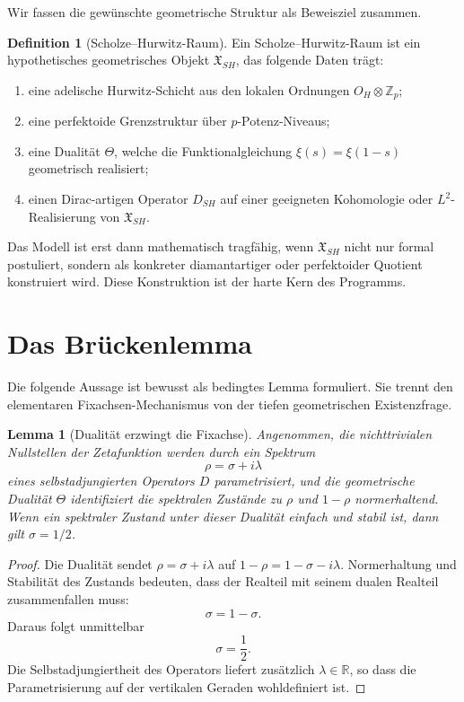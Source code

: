 \documentclass[11pt,a4paper,reqno]{amsart}
\newtheorem{lemma}[theorem]{Lemma}
\theoremstyle{definition}
\newtheorem{definition}[theorem]{Definition}
\numberwithin{equation}{section}
\newcommand{\R}{\mathbb{R}}
\newcommand{\Z}{\mathbb{Z}}
\newcommand{\OH}{O_H}
\begin{document}
Wir fassen die gewünschte geometrische Struktur als Beweisziel zusammen.

\begin{definition}[Scholze--Hurwitz-Raum]
Ein Scholze--Hurwitz-Raum ist ein hypothetisches geometrisches Objekt \(\mathfrak{X}_{SH}\), das folgende Daten trägt:
\begin{enumerate}
  \item eine adelische Hurwitz-Schicht aus den lokalen Ordnungen \(\OH\otimes\Z_p\);
  \item eine perfektoide Grenzstruktur über \(p\)-Potenz-Niveaus;
  \item eine Dualität \(\Theta\), welche die Funktionalgleichung \(\xi(s)=\xi(1-s)\) geometrisch realisiert;
  \item einen Dirac-artigen Operator \(D_{SH}\) auf einer geeigneten Kohomologie oder \(L^2\)-Realisierung von \(\mathfrak{X}_{SH}\).
\end{enumerate}
\end{definition}

Das Modell ist erst dann mathematisch tragfähig, wenn \(\mathfrak{X}_{SH}\) nicht nur formal postuliert, sondern als konkreter diamantartiger oder perfektoider Quotient konstruiert wird. Diese Konstruktion ist der harte Kern des Programms.

\section{Das Brückenlemma}

Die folgende Aussage ist bewusst als bedingtes Lemma formuliert. Sie trennt den elementaren Fixachsen-Mechanismus von der tiefen geometrischen Existenzfrage.

\begin{lemma}[Dualität erzwingt die Fixachse]
Angenommen, die nichttrivialen Nullstellen der Zetafunktion werden durch ein Spektrum
\[
  \rho=\sigma+i\lambda
\]
eines selbstadjungierten Operators \(D\) parametrisiert, und die geometrische Dualität \(\Theta\) identifiziert die spektralen Zustände zu \(\rho\) und \(1-\rho\) normerhaltend. Wenn ein spektraler Zustand unter dieser Dualität einfach und stabil ist, dann gilt \(\sigma=1/2\).
\end{lemma}

\begin{proof}
Die Dualität sendet \(\rho=\sigma+i\lambda\) auf \(1-\rho=1-\sigma-i\lambda\). Normerhaltung und Stabilität des Zustands bedeuten, dass der Realteil mit seinem dualen Realteil zusammenfallen muss:
\[
  \sigma=1-\sigma.
\]
Daraus folgt unmittelbar
\[
  \sigma=\frac12.
\]
Die Selbstadjungiertheit des Operators liefert zusätzlich \(\lambda\in\R\), so dass die Parametrisierung auf der vertikalen Geraden wohldefiniert ist.
\end{proof}
\end{document}
